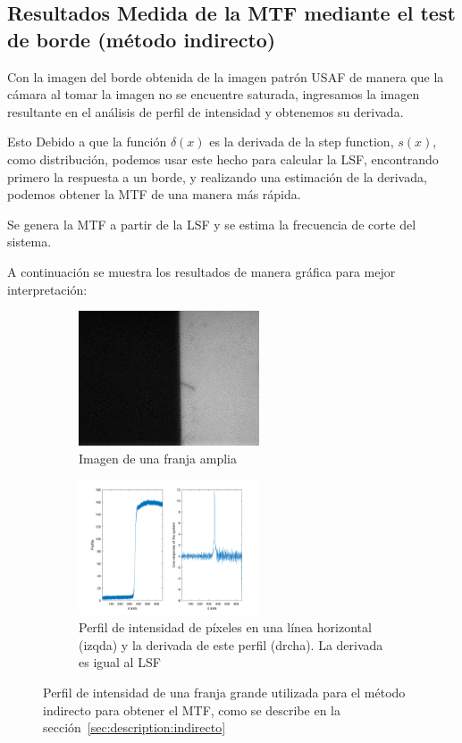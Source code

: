 \documentclass{./packages/optica-article}
\begin{document}
\subsection{Resultados Medida de la MTF mediante el test de borde (método indirecto)}\label{sec:resultados:indirecto}
Con la imagen del borde obtenida de la imagen patrón USAF de manera que la cámara al tomar la imagen no se encuentre saturada, ingresamos la imagen resultante en el análisis de perfil de intensidad y obtenemos su derivada.

Esto Debido a que la función $\delta(x)$ es la derivada de la step function, $s(x)$, como distribución, podemos usar este hecho para calcular la LSF, encontrando primero la respuesta a un borde, y realizando una estimación de la derivada, podemos obtener la MTF de una manera más rápida.

Se genera la MTF a partir de la LSF y se estima la frecuencia de corte del sistema.

A continuación se muestra los resultados de manera gráfica para mejor interpretación:
\begin{figure}[hptb]
	\centering
	\begin{subfigure}[t]{0.35\textwidth}
		\centering
		\includegraphics[height=4cm]{edge_large_line}
		\caption{Imagen de una franja amplia}\label{fig:perfil:img}
	\end{subfigure}
	\quad
	\begin{subfigure}[t]{0.60\textwidth}
		\centering
		\includegraphics[width=\textwidth, height=4cm]{lsf_edge}
		\caption{Perfil de intensidad de píxeles en una línea horizontal (izqda) y la derivada de este perfil (drcha). La derivada es igual al LSF}\label{fig:perfil:graph}
	\end{subfigure}
	\caption{Perfil de intensidad de una franja grande utilizada para el método indirecto para obtener el MTF, como se describe en la sección~\ref{sec:description:indirecto}}\label{fig:perfil}
\end{figure}
\end{document}
